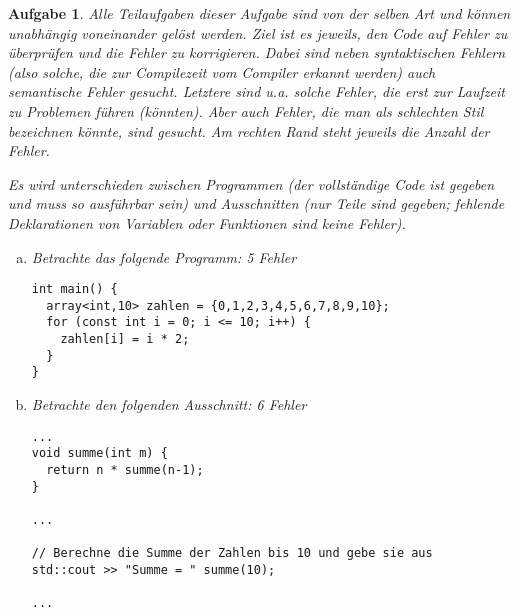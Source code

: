 \documentclass[a4paper,12pt,parskip=full]{scrartcl}
\theoremstyle{exercise}
\newtheorem{exercise}{Aufgabe}
\begin{document}
\begin{exercise}
Alle Teilaufgaben dieser Aufgabe sind von der selben Art und können unabhängig voneinander gelöst werden. Ziel ist es jeweils, den Code auf Fehler zu überprüfen und die Fehler zu korrigieren. Dabei sind neben \emph{syntaktischen} Fehlern (also solche, die zur Compilezeit vom Compiler erkannt werden) auch \emph{semantische} Fehler gesucht. Letztere sind u.a. solche Fehler, die erst zur Laufzeit zu Problemen führen (könnten). Aber auch Fehler, die man als \glqq{}schlechten Stil\grqq{} bezeichnen könnte, sind gesucht. Am rechten Rand steht jeweils die Anzahl der Fehler.

Es wird unterschieden zwischen Programmen (der vollständige Code ist gegeben und muss so ausführbar sein) und Ausschnitten (nur Teile sind gegeben; fehlende Deklarationen von Variablen oder Funktionen sind \emph{keine}
Fehler).
\begin{enumerate}[a)]
    \item Betrachte das folgende Programm: \hfill 5 Fehler
    \begin{lstlisting}
int main() {
  array<int,10> zahlen = {0,1,2,3,4,5,6,7,8,9,10};
  for (const int i = 0; i <= 10; i++) {
    zahlen[i] = i * 2;
  }
}
    \end{lstlisting}
    \item Betrachte den folgenden Ausschnitt: \hfill 6 Fehler
    \begin{lstlisting}
...
void summe(int m) {
  return n * summe(n-1);
}
      
...
      
// Berechne die Summe der Zahlen bis 10 und gebe sie aus
std::cout >> "Summe = " summe(10);
      
...
    \end{lstlisting}
\end{enumerate}
\end{exercise}
\end{document}
